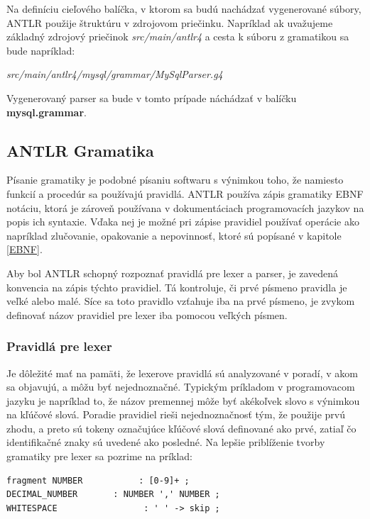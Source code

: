 Na definíciu cieľového balíčka, v ktorom sa budú nachádzať vygenerované súbory, \mbox{ANTLR} použije štruktúru v zdrojovom priečinku. Napríklad ak uvažujeme základný zdrojový priečinok \textit{src/main/antlr4} a cesta k súboru z gramatikou sa bude napríklad:

\begin{center}
\textit{src/main/antlr4/mysql/grammar/MySqlParser.g4}
\end{center}

Vygenerovaný parser sa bude v tomto prípade náchádzať v balíčku \textbf{mysql.grammar}.

\subsection{ANTLR Gramatika}\label{antlr_grammar}
Písanie gramatiky je podobné písaniu softwaru s výnimkou toho, že namiesto funkcií a procedúr sa používajú pravidlá. ANTLR používa zápis gramatiky EBNF notáciu, ktorá je zároveň používana v dokumentáciach programovacích jazykov na popis ich syntaxie. Vďaka nej je možné pri zápise pravidiel používať operácie ako napríklad zlučovanie, opakovanie a nepovinnosť, ktoré sú popísané v kapitole \ref{EBNF}.

Aby bol ANTLR schopný rozpoznať pravidlá pre lexer a parser, je zavedená konvencia na zápis týchto pravidiel. Tá kontroluje, či prvé písmeno pravidla je veľké alebo malé. Síce sa toto pravidlo vzťahuje iba na prvé písmeno, je zvykom definovať názov pravidiel pre lexer iba pomocou veľkých písmen. 

\subsubsection{Pravidlá pre lexer}
Je dôležité mať na pamäti, že lexerove pravidlá sú analyzované v poradí, v akom sa objavujú, a môžu byť nejednoznačné. Typickým príkladom v programovacom jazyku je napríklad to, že názov premennej môže byť akékoľvek slovo s výnimkou na kľúčové slová. Poradie pravidiel rieši nejednoznačnosť tým, že použije prvú zhodu, a preto sú tokeny označujúce kľúčové slová definované ako prvé, zatiaľ čo identifikačné znaky sú uvedené ako posledné. Na lepšie priblíženie tvorby gramatiky pre lexer sa pozrime na príklad:

\begin{lstlisting}[basicstyle=\small, keepspaces=true]
fragment NUMBER           : [0-9]+ ;
DECIMAL_NUMBER       : NUMBER ',' NUMBER ;
WHITESPACE                 : ' ' -> skip ;
\end{lstlisting}


